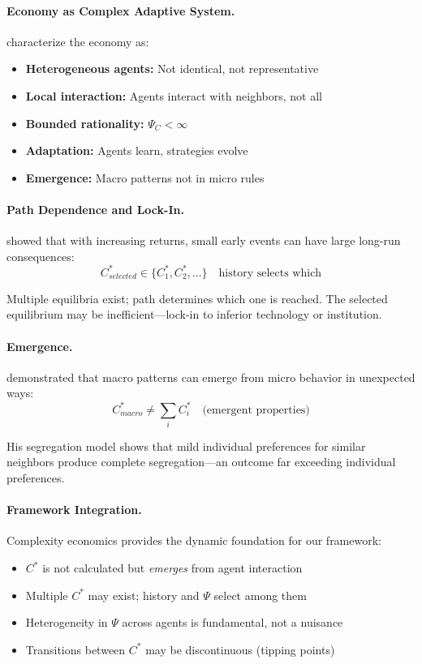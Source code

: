 \paragraph{Economy as Complex Adaptive System.}
\citet{arthur1997} characterize the economy as:
\begin{itemize}
  \item \textbf{Heterogeneous agents:} Not identical, not representative
  \item \textbf{Local interaction:} Agents interact with neighbors, not all
  \item \textbf{Bounded rationality:} $\Psi_C < \infty$
  \item \textbf{Adaptation:} Agents learn, strategies evolve
  \item \textbf{Emergence:} Macro patterns not in micro rules
\end{itemize}

\paragraph{Path Dependence and Lock-In.}
\citet{arthur1989,arthur1994} showed that with increasing returns, small early
events can have large long-run consequences:
\begin{equation}
  C^*_{selected} \in \{C^*_1, C^*_2, \ldots\} \quad \text{history selects which}
\end{equation}

Multiple equilibria exist; path determines which one is reached. The selected
equilibrium may be inefficient---lock-in to inferior technology or institution.

\paragraph{Emergence.}
\citet{schelling1971,schelling1978} demonstrated that macro patterns can emerge
from micro behavior in unexpected ways:
\begin{equation}
  C^*_{macro} \neq \sum_i C^*_i \quad \text{(emergent properties)}
\end{equation}

His segregation model shows that mild individual preferences for similar neighbors
produce complete segregation---an outcome far exceeding individual preferences.

\paragraph{Framework Integration.}
Complexity economics provides the dynamic foundation for our framework:
\begin{itemize}
  \item $C^*$ is not calculated but \emph{emerges} from agent interaction
  \item Multiple $C^*$ may exist; history and $\Psi$ select among them
  \item Heterogeneity in $\Psi$ across agents is fundamental, not a nuisance
  \item Transitions between $C^*$ may be discontinuous (tipping points)
\end{itemize}

